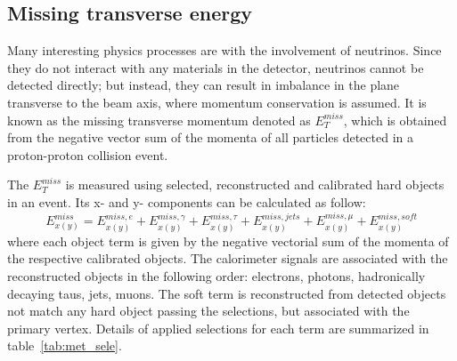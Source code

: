 \subsection{Missing transverse energy}

Many interesting physics processes are with the involvement of neutrinos.
Since they do not interact with any materials in the detector, neutrinos cannot be detected directly;
but instead, they can result in imbalance in the plane transverse to the beam axis, where momentum conservation is assumed.
It is known as the missing transverse momentum denoted as $E_{T}^{miss}$,
which is obtained from the negative vector sum of the momenta of all particles detected in a proton-proton collision event.

The $E_{T}^{miss}$ is measured using selected, reconstructed and calibrated hard objects in an event.
Its x- and y- components can be calculated as follow\cite{Aaboud2018}:
\begin{equation} \label{eq:met_xy}
	E_{x(y)}^{miss} = E_{x(y)}^{miss, e} + E_{x(y)}^{miss, \gamma} + E_{x(y)}^{miss, \tau} + E_{x(y)}^{miss, jets} + E_{x(y)}^{miss, \mu} + E_{x(y)}^{miss, soft}
\end{equation}
where each object term is given by the negative vectorial sum of the momenta of the respective calibrated objects.
The calorimeter signals are associated with the reconstructed objects in the following order: electrons, photons, hadronically decaying taus, jets, muons.
The soft term is reconstructed from detected objects not match any hard object passing the selections, but associated with the primary vertex.
Details of applied selections for each term are summarized in table~\ref{tab:met_sele}.

